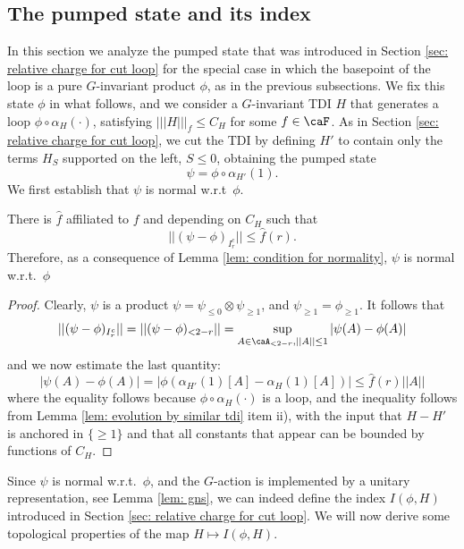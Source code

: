 \subsection{The pumped state and its index}\label{sec: states cut loop}

In this section we analyze the pumped state that was introduced in Section \ref{sec: relative charge for cut loop} for the special case in which the basepoint of the loop is a pure $G$-invariant product $\phi$, as in the previous subsections. 
We fix this state $\phi$ in what follows, and we consider a $G$-invariant TDI $H$ that generates a loop $\phi\circ\alpha_H(\cdot)$, satisfying  $|||H|||_f\leq C_H$ for some $f\in\caF$.  As in Section \ref{sec: relative charge for cut loop}, 
we cut the TDI by defining $H'$ to contain only the terms $H_S$ supported on the left, $S \leq 0$,  obtaining the pumped state
\begin{equation}\label{eq: pumped state}
\psi= \phi\circ \alpha_{H'}(1).
\end{equation}
We first establish that $\psi$ is normal w.r.t\ $\phi$.
\begin{lemma}\label{lem: cut state}
	There is $\hat{f}$ affiliated to $f$ and depending on $C_H$ such that 
	\begin{equation}\label{eq: two-sided bound}
	|| (\psi-\phi)_{I_r^c} || \leq  \hat{f}(r).
	\end{equation}
	Therefore, as a consequence of Lemma \ref{lem: condition for normality}, $\psi$ is normal w.r.t.\ $\phi$
\end{lemma}
\begin{proof}
	Clearly, $\psi$ is a product $\psi=\psi_{\leq 0}\otimes \psi_{\geq 1}$, and $\psi_{\geq 1}=\phi_{\geq 1}$. It follows that 
	$$
	||(\psi-\phi)_{I_r^c} ||= || (\psi-\phi)_{<2-r} ||=\sup_{A \in\caA_{<2-r}, ||A|| \leq 1}  |\psi(A)-\phi(A)|
	$$
	and we now estimate the last quantity:
	\begin{equation}
	| \psi(A) - \phi(A)| =|\phi( \alpha_{H'}(1)[A] - \alpha_H(1)[A]) | \leq  \hat{f}(r) ||A||
	\label{eq: onesided bound}
	\end{equation}
	where the equality follows because  $\phi\circ\alpha_{H}(\cdot)$ is a loop,
	and the inequality follows from Lemma \ref{lem: evolution by similar tdi} item ii), with the input that $H-H'$ is anchored in $\{\geq 1\}$ and that all constants that appear can be bounded by functions of $C_H$.  
\end{proof}

Since $\psi$ is normal w.r.t.\ $\phi$, and the $G$-action is implemented by a unitary representation, see Lemma \ref{lem: gns},  we can indeed define the index $I(\phi,H)$ introduced in Section \ref{sec: relative charge for cut loop}.  We will now derive some topological properties of the map $H\mapsto I(\phi,H) $.






